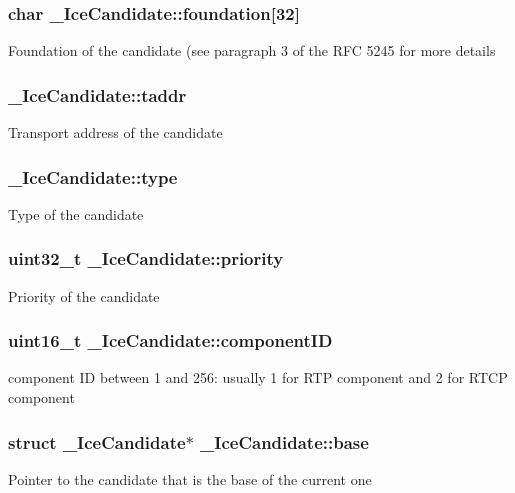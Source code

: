 \subsubsection[{foundation}]{\setlength{\rightskip}{0pt plus 5cm}char {\bf \_\-IceCandidate::foundation}[32]}\label{struct__IceCandidate_a9a0efb52ab0c3af220d49caf61e28162}
Foundation of the candidate (see paragraph 3 of the RFC 5245 for more details 
\subsubsection[{taddr}]{ {\bf \_\-IceCandidate::taddr}}\label{struct__IceCandidate_a4297288cc2d0127fb346031078e75a63}
Transport address of the candidate 
\subsubsection[{type}]{ {\bf \_\-IceCandidate::type}}\label{struct__IceCandidate_a40fd8e97d3153bc1206030e59b89f0f7}
Type of the candidate 
\subsubsection[{priority}]{\setlength{\rightskip}{0pt plus 5cm}uint32\_\-t {\bf \_\-IceCandidate::priority}}\label{struct__IceCandidate_aad4c4e08afff5c03e553894f0c1a4e43}
Priority of the candidate 
\subsubsection[{componentID}]{\setlength{\rightskip}{0pt plus 5cm}uint16\_\-t {\bf \_\-IceCandidate::componentID}}\label{struct__IceCandidate_af6fe32c2614ae53a3bd2b011b242742a}
component ID between 1 and 256: usually 1 for RTP component and 2 for RTCP component 
\subsubsection[{base}]{\setlength{\rightskip}{0pt plus 5cm}struct {\bf \_\-IceCandidate}$\ast$ {\bf \_\-IceCandidate::base}\hspace{0.3cm}{\ttfamily  [read]}}\label{struct__IceCandidate_ad14144870c6579183cabb7f7fb5086d4}
Pointer to the candidate that is the base of the current one 
